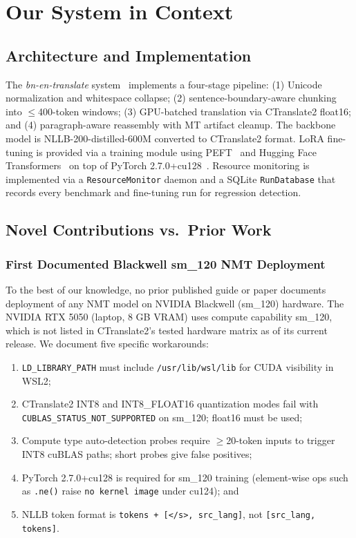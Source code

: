 \documentclass[conference]{IEEEtran}
\begin{document}
\section{Our System in Context}
\label{sec:ours}

\subsection{Architecture and Implementation}

The \textit{bn-en-translate} system~\cite{biswas2025bnentr} implements a
four-stage pipeline: (1) Unicode normalization and whitespace collapse;
(2) sentence-boundary-aware chunking into $\le$400-token windows;
(3) GPU-batched translation via CTranslate2 float16; and
(4) paragraph-aware reassembly with MT artifact cleanup.
The backbone model is NLLB-200-distilled-600M converted to CTranslate2
format.
LoRA fine-tuning is provided via a training module using PEFT~\cite{mangrulkar2022peft}
and Hugging Face Transformers~\cite{wolf2020transformers} on top of
PyTorch 2.7.0+cu128~\cite{paszke2019pytorch}.
Resource monitoring is implemented via a \texttt{ResourceMonitor} daemon
and a SQLite \texttt{RunDatabase} that records every benchmark and
fine-tuning run for regression detection.

\subsection{Novel Contributions vs.\ Prior Work}

\subsubsection{First Documented Blackwell sm\_120 NMT Deployment}
To the best of our knowledge, no prior published guide or paper documents
deployment of any NMT model on NVIDIA Blackwell (sm\_120) hardware.
The NVIDIA RTX 5050 (laptop, 8 GB VRAM) uses compute capability sm\_120,
which is not listed in CTranslate2's tested hardware matrix as of its
current release.
We document five specific workarounds:
\begin{enumerate}
  \item \texttt{LD\_LIBRARY\_PATH} must include \texttt{/usr/lib/wsl/lib}
    for CUDA visibility in WSL2;
  \item CTranslate2 INT8 and INT8\_FLOAT16 quantization modes fail with
    \texttt{CUBLAS\_STATUS\_NOT\_SUPPORTED} on sm\_120; float16 must be
    used;
  \item Compute type auto-detection probes require $\ge$20-token inputs
    to trigger INT8 cuBLAS paths; short probes give false positives;
  \item PyTorch 2.7.0+cu128 is required for sm\_120 training (element-wise
    ops such as \texttt{.ne()} raise \texttt{no kernel image} under
    cu124); and
  \item NLLB token format is \texttt{tokens + [</s>, src\_lang]}, not
    \texttt{[src\_lang, tokens]}.
\end{enumerate}
\end{document}
